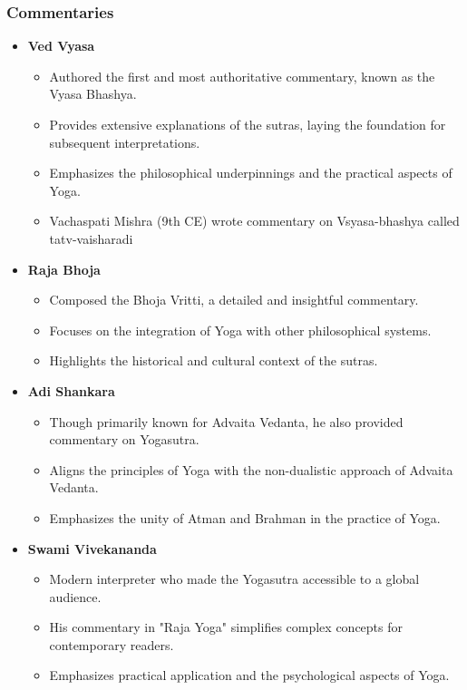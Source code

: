 \begin{frame}[fragile]\frametitle{Commentaries}
    
    \begin{itemize}
        \item \textbf{Ved Vyasa}
        \begin{itemize}
            \item Authored the first and most authoritative commentary, known as the Vyasa Bhashya.
            \item Provides extensive explanations of the sutras, laying the foundation for subsequent interpretations.
            \item Emphasizes the philosophical underpinnings and the practical aspects of Yoga.
			\item Vachaspati Mishra (9th CE) wrote commentary on Vsyasa-bhashya called tatv-vaisharadi
        \end{itemize}
        
        \item \textbf{Raja Bhoja}
        \begin{itemize}
            \item Composed the Bhoja Vritti, a detailed and insightful commentary.
            \item Focuses on the integration of Yoga with other philosophical systems.
            \item Highlights the historical and cultural context of the sutras.
        \end{itemize}
        
        \item \textbf{Adi Shankara}
        \begin{itemize}
            \item Though primarily known for Advaita Vedanta, he also provided commentary on Yogasutra.
            \item Aligns the principles of Yoga with the non-dualistic approach of Advaita Vedanta.
            \item Emphasizes the unity of Atman and Brahman in the practice of Yoga.
        \end{itemize}
        
        \item \textbf{Swami Vivekananda}
        \begin{itemize}
            \item Modern interpreter who made the Yogasutra accessible to a global audience.
            \item His commentary in "Raja Yoga" simplifies complex concepts for contemporary readers.
            \item Emphasizes practical application and the psychological aspects of Yoga.
        \end{itemize}
    \end{itemize}
    
\end{frame}


